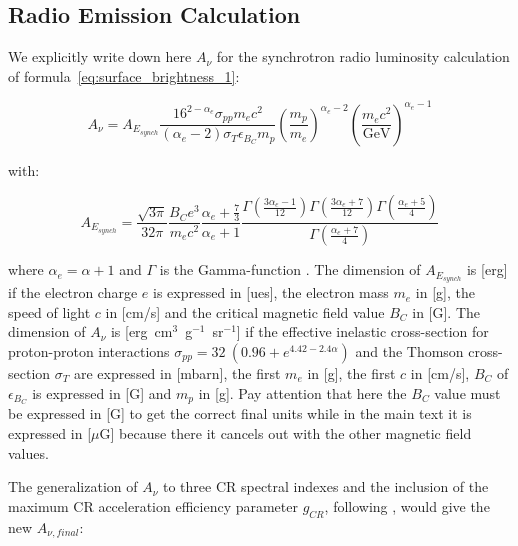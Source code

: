 \documentclass[traditabstract]{aa}
\newcommand{\rmn}{\mathrm}
\begin{document}
\begin{appendix}
\section{Radio Emission Calculation}
\label{app:A}

We explicitly write down here $A_{\nu}$ for the synchrotron radio luminosity calculation of formula~\ref{eq:surface_brightness_1}:

\begin{equation}
A_{\nu} = A_{E_{synch}} \frac{16^{2-\alpha_{e}}\sigma_{pp}m_{e}c^{2}}{(\alpha_{e}-2)\sigma_{T}\epsilon_{B_{C}}m_{p}}\left(\frac{m_p}{m_e}\right)^{\alpha_{e}-2}
\left(\frac{m_{e}c^{2}}{\rmn{GeV}}\right)^{\alpha_{e}-1}
\end{equation}

with:

\begin{equation}
A_{E_{synch}} = \frac{\sqrt{3\pi}}{32\pi}\frac{B_{C}e^{3}}{m_{e}c^{2}}\frac{\alpha_{e}+\frac{7}{3}}{\alpha_{e}+1}\frac{\Gamma\left(\frac{3\alpha_{e}-1}{12}\right)\Gamma\left(\frac{3\alpha_{e}+7}{12}\right)\Gamma\left(\frac{\alpha_{e}+5}{4}\right)}{\Gamma\left(\frac{\alpha_{e}+7}{4}\right)}
\end{equation}

where $\alpha_{e}=\alpha+1$ and $\Gamma$ is the Gamma-function \citep{1965hmfw.book.....A}. The dimension of $A_{E_{synch}}$ is [erg] if the electron charge $e$ is expressed in [ues], the electron mass $m_{e}$ in [g], the speed of light $c$ in [cm/s] and the critical magnetic field value $B_{C}$ in [G]. The dimension of $A_{\nu}$ is [erg~cm$^{3}$~g$^{-1}$~sr$^{-1}$] if the effective inelastic cross-section for proton-proton interactions $\sigma_{pp} = 32~(0.96+e^{4.42-2.4\alpha})$ and the Thomson cross-section $\sigma_{T}$ are expressed in [mbarn], the first $m_{e}$ in [g], the first $c$ in [cm/s], $B_{C}$ of $\epsilon_{B_{C}}$ is expressed in [G] and $m_p$ in [g]. Pay attention that here the $B_{C}$ value must be expressed in [G] to get the correct final units while in the main text it is expressed in [$\mu$G] because there it cancels out with the other magnetic field values.  

The generalization of $A_{\nu}$ to three CR spectral indexes and the inclusion of the maximum CR acceleration efficiency parameter $g_{CR}$, following \cite{2010MNRAS.409..449P}, would give the new $A_{\nu, final}$:


\end{appendix}
\end{document}
